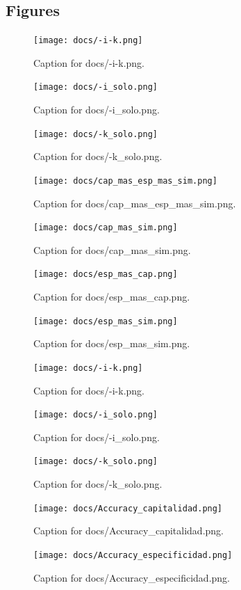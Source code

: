 \documentclass{article}
\begin{document}
\subsection{Figures}
\begin{figure}[h] \centering \texttt{[image: docs/-i-k.png]} \caption{Caption for docs/-i-k.png.} \end{figure}
\begin{figure}[h] \centering \texttt{[image: docs/-i\_solo.png]} \caption{Caption for docs/-i_solo.png.} \end{figure}
\begin{figure}[h] \centering \texttt{[image: docs/-k\_solo.png]} \caption{Caption for docs/-k_solo.png.} \end{figure}
\begin{figure}[h] \centering \texttt{[image: docs/cap\_mas\_esp\_mas\_sim.png]} \caption{Caption for docs/cap_mas_esp_mas_sim.png.} \end{figure}
\begin{figure}[h] \centering \texttt{[image: docs/cap\_mas\_sim.png]} \caption{Caption for docs/cap_mas_sim.png.} \end{figure}
\begin{figure}[h] \centering \texttt{[image: docs/esp\_mas\_cap.png]} \caption{Caption for docs/esp_mas_cap.png.} \end{figure}
\begin{figure}[h] \centering \texttt{[image: docs/esp\_mas\_sim.png]} \caption{Caption for docs/esp_mas_sim.png.} \end{figure}
\begin{figure}[h] \centering \texttt{[image: docs/-i-k.png]} \caption{Caption for docs/-i-k.png.} \end{figure}
\begin{figure}[h] \centering \texttt{[image: docs/-i\_solo.png]} \caption{Caption for docs/-i_solo.png.} \end{figure}
\begin{figure}[h] \centering \texttt{[image: docs/-k\_solo.png]} \caption{Caption for docs/-k_solo.png.} \end{figure}
\begin{figure}[h] \centering \texttt{[image: docs/Accuracy\_capitalidad.png]} \caption{Caption for docs/Accuracy_capitalidad.png.} \end{figure}
\begin{figure}[h] \centering \texttt{[image: docs/Accuracy\_especificidad.png]} \caption{Caption for docs/Accuracy_especificidad.png.} \end{figure}
\end{document}
